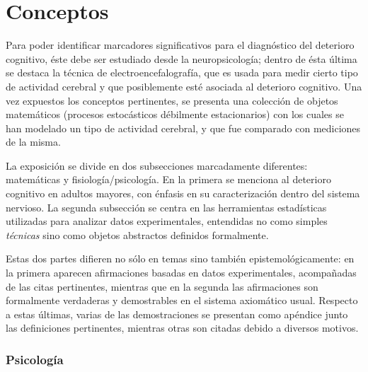 
\chapter{Conceptos}

Para poder identificar marcadores significativos para el diagnóstico del deterioro cognitivo, 
éste debe ser estudiado desde la neuropsicología; dentro de ésta última se destaca la técnica de 
electroencefalografía, que es usada para medir cierto tipo de actividad cerebral y que posiblemente 
esté asociada al deterioro cognitivo. 
Una vez expuestos los conceptos pertinentes, se presenta una colección de objetos matemáticos
(procesos estocásticos débilmente estacionarios) con los cuales se han modelado un tipo de
actividad cerebral, y que fue comparado con mediciones de la misma.

La exposición se divide en dos subsecciones marcadamente diferentes: matemáticas y 
fisiología/psicología.
En la primera se menciona al deterioro cognitivo en adultos mayores, con énfasis en su 
caracterización dentro del sistema nervioso.
La segunda subsección se centra en las herramientas estadísticas utilizadas para analizar datos 
experimentales, entendidas no como simples \textit{técnicas} sino como objetos abstractos
definidos formalmente.

Estas dos partes difieren no sólo en temas sino también epistemológicamente: en la
primera aparecen afirmaciones basadas en datos experimentales, acompañadas de las citas 
pertinentes, mientras que en la segunda las
afirmaciones son formalmente verdaderas y demostrables en el sistema 
axiomático usual. Respecto a estas últimas, varias de las demostraciones se presentan como 
apéndice junto las definiciones pertinentes, mientras otras son citadas debido a diversos motivos.

\subsection{Psicología}


